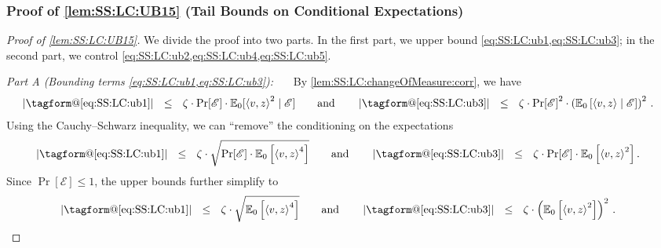 \documentclass[11pt,letterpaper]{article}
\makeatletter
\theoremstyle{plain}
\theoremstyle{definition}
\theoremstyle{remark}
\renewcommand{\eqref}[1]{\textup{\eqrefform@{\ref{#1}}}}
\let\eqrefform@\tagform@
\newcommand{\qquadtext}[1]{\qquad\text{#1}\qquad}
\newcommand{\qquadand}{\qquadtext{and}}
\def\abs#1{\left| #1 \right|}
\newcommand{\sinsquare}[1]{\ensuremath{[#1]}}
\newcommand{\inparen}[1]{\ensuremath{\left(#1\right)}}
\newcommand{\insquare}[1]{\ensuremath{\left[#1\right]}}
\newcommand{\inangle}[1]{\left\langle#1\right\rangle}
\newcommand{\evE}{\ensuremath{\mathscr{E}}}
\newcommand{\E}{\operatornamewithlimits{\mathbb{E}}}
\newcommand{\Ex}{\E}
\newcommand{\itparagraph}[1]{\medskip \noindent\textit{#1}~}
\newcommand{\paragraphit}[1]{\itparagraph{#1}}
\makeatother
\begin{document}
{{    
    \subsubsection{Proof of \cref{lem:SS:LC:UB15} (Tail Bounds on Conditional Expectations)}
        \label{sec:proofof:lem:SS:LC:UB15}
    \begin{proof}[Proof of \cref{lem:SS:LC:UB15}]
            
        We divide the proof into two parts. 
        In the first part, we upper bound \cref{eq:SS:LC:ub1,eq:SS:LC:ub3}; in the second part, we control \cref{eq:SS:LC:ub2,eq:SS:LC:ub4,eq:SS:LC:ub5}.
        
    \paragraphit{Part A (Bounding terms \cref{eq:SS:LC:ub1,eq:SS:LC:ub3}):}~~
            By \cref{lem:SS:LC:changeOfMeasure:corr}, we have
            \begin{align*}
                \abs{\eqref{eq:SS:LC:ub1}}
                &~~\leq~~
                \zeta \cdot \Pr[\evE]
                \cdot \Ex\nolimits_{0}\sinsquare{\inangle{v, z}^2\mid \evE}
                \qquadand
                \abs{\eqref{eq:SS:LC:ub3}}
                ~~\leq~~
                \zeta \cdot \Pr[\evE]^2
                \cdot \inparen{\Ex\nolimits_{0}\insquare{\inangle{v, z}\mid \evE}}^2\,.
            \end{align*}
            Using the Cauchy--Schwarz inequality, we can ``remove'' the conditioning on the expectations 
           \begin{align*}
                \abs{\eqref{eq:SS:LC:ub1}}
                &~~\leq~~
                \zeta \cdot \sqrt{\Pr[\evE] \cdot \Ex\nolimits_{0}\insquare{\inangle{v, z}^4}}
                \qquadand
                \abs{\eqref{eq:SS:LC:ub3}}
                ~~\leq~~
                \zeta \cdot \Pr[\evE]
                \cdot {\Ex\nolimits_{0}\insquare{{\inangle{v, z}}^2}}\,.
           \end{align*}
           Since $\Pr[\evE]\le 1$, the upper bounds further simplify to 
           \begin{align*}
                \abs{\eqref{eq:SS:LC:ub1}}
                &~~\leq~~
                \zeta \cdot 
                    \sqrt{\Ex\nolimits_{0}\insquare{\inangle{v, z}^4}}
                \qquadand
                \abs{\eqref{eq:SS:LC:ub3}}
                ~~\leq~~
                \zeta \cdot 
                    \inparen{\Ex\nolimits_{0}\insquare{{\inangle{v, z}}^2}}^2\,.
           \end{align*} 


\end{proof}}}
\end{document}

